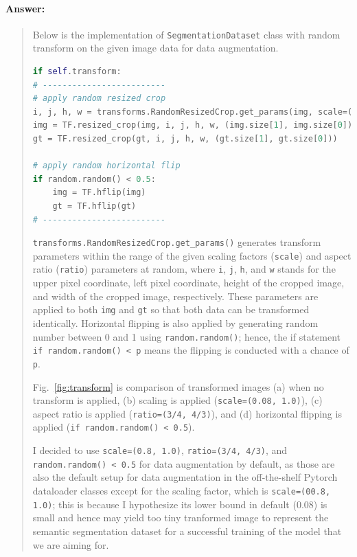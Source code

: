 \documentclass[11pt]{article}
\begin{document}
\paragraph{Answer:} 
\begin{quote}

Below is the implementation of \texttt{SegmentationDataset} class with random transform on the given image data for data augmentation.

\begin{lstlisting}[language=Python, basicstyle=\scriptsize]
if self.transform:
# -------------------------
# apply random resized crop
i, j, h, w = transforms.RandomResizedCrop.get_params(img, scale=(0.8,1), ratio=(3/4,4/3))
img = TF.resized_crop(img, i, j, h, w, (img.size[1], img.size[0]))
gt = TF.resized_crop(gt, i, j, h, w, (gt.size[1], gt.size[0]))

# apply random horizontal flip
if random.random() < 0.5:
    img = TF.hflip(img)
    gt = TF.hflip(gt)
# -------------------------
\end{lstlisting}

\texttt{transforms.RandomResizedCrop.get\_params()} generates transform parameters within the range of the given scaling factors (\texttt{scale}) and aspect ratio (\texttt{ratio}) parameters at random, where \texttt{i}, \texttt{j}, \texttt{h}, and \texttt{w} stands for the upper pixel coordinate, left pixel coordinate, height of the cropped image, and width of the cropped image, respectively. These parameters are applied to both \texttt{img} and \texttt{gt} so that both data can be transformed identically. Horizontal flipping is also applied by generating random number between 0 and 1 using \texttt{random.random()}; hence, the if statement \texttt{if random.random() < p} means the flipping is conducted with a chance of \texttt{p}. 

Fig.~\ref{fig:transform} is comparison of transformed images (a) when no transform is applied, (b) scaling is applied (\texttt{scale=(0.08, 1.0)}), (c) aspect ratio is applied (\texttt{ratio=(3/4, 4/3)}), and (d) horizontal flipping is applied (\texttt{if random.random() < 0.5}). 

I decided to use \texttt{scale=(0.8, 1.0)}, \texttt{ratio=(3/4, 4/3)}, and \texttt{random.random() < 0.5} for data augmentation by default, as those are also the default setup for data augmentation in the off-the-shelf Pytorch dataloader classes except for the scaling factor, which is \texttt{scale=(00.8, 1.0)}; this is because I hypothesize its lower bound in default (0.08) is small and hence may yield too tiny tranformed image to represent the semantic segmentation dataset for a successful training of the model that we are aiming for. 


\end{quote}
\end{document}

